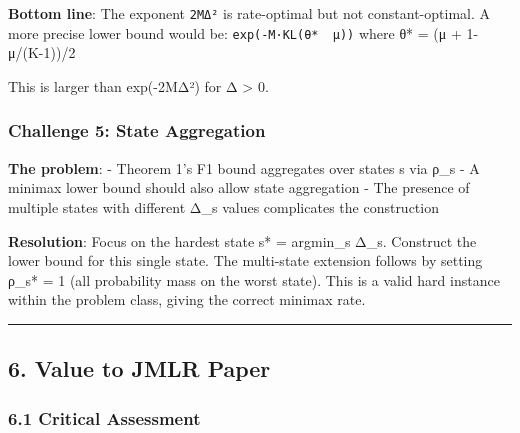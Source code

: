 \documentclass[
  12pt,
]{article}
\begin{document}
\textbf{Bottom line}: The exponent \texttt{2MΔ²} is rate-optimal but not
constant-optimal. A more precise lower bound would be:
\texttt{exp(-M·KL(θ*\ \textbar{}\textbar{}\ μ))} where θ* = (μ +
1-μ/(K-1))/2

This is larger than exp(-2MΔ²) for Δ \textgreater{} 0.

\subsubsection{Challenge 5: State
Aggregation}\label{challenge-5-state-aggregation}

\textbf{The problem}: - Theorem 1's F1 bound aggregates over states s
via ρ\_s - A minimax lower bound should also allow state aggregation -
The presence of multiple states with different Δ\_s values complicates
the construction

\textbf{Resolution}: Focus on the hardest state s* = argmin\_s Δ\_s.
Construct the lower bound for this single state. The multi-state
extension follows by setting ρ\_s* = 1 (all probability mass on the
worst state). This is a valid hard instance within the problem class,
giving the correct minimax rate.

\begin{center}\rule{0.5\linewidth}{0.5pt}\end{center}

\subsection{6. Value to JMLR Paper}\label{value-to-jmlr-paper}

\subsubsection{6.1 Critical Assessment}\label{critical-assessment}
\end{document}
